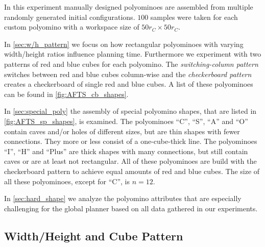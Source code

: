 In this experiment manually designed polyominoes are assembled from multiple randomly generated initial configurations.
$100$ samples were taken for each custom polyomino with a workspace size of $50 r_C \times 50 r_C$.

In \autoref{sec:w/h_pattern} we focus on how rectangular polyominoes with varying width/height ratios influence planning time.
Furthermore we experiment with two patterns of red and blue cubes for each polyomino.
The \textit{switching-column pattern} switches between red and blue cubes column-wise and the \textit{checkerboard pattern} creates a checkerboard of single red and blue cubes.
A list of these polyominoes can be found in \autoref{fig:AFTS_cb_shapes}.

In \autoref{sec:special_poly} the assembly of special polyomino shapes, that are listed in \autoref{fig:AFTS_sp_shapes}, is examined. 
The polyominoes ``C'', ``S'', ``A'' and ``O'' contain caves and/or holes of different sizes, but are thin shapes with fewer connections.
They more or less consist of a one-cube-thick line.
The polyominoes ``I'', ``H'' and ``Plus'' are thick shapes with many connections, but still contain caves or are at least not rectangular.
All of these polyominoes are build with the checkerboard pattern to achieve equal amounts of red and blue cubes.
The size of all these polyominoes, except for ``C'', is $n=12$.
 
In \autoref{sec:hard_shape} we analyze the polyomino attributes that are especially challenging for the global planner based on all data gathered in our experiments.

\subsection{Width/Height and Cube Pattern}
\label{sec:w/h_pattern}

